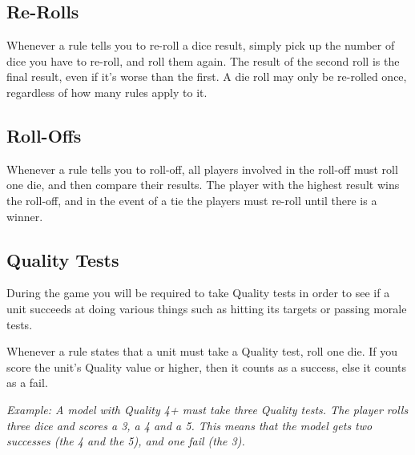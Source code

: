 \documentclass[9pt, a4paper, bookmarks=false]{extarticle}            %
\begin{document}
\begin{multicols}{2}
\subsection{Re-Rolls}

Whenever a rule tells you to re-roll a dice result, simply pick up the number of dice you have to re-roll, and roll them again. The result of the second roll is the final result, even if it’s worse than the first. A die roll may only be re-rolled once, regardless of how many rules apply to it.

\subsection{Roll-Offs}

Whenever a rule tells you to roll-off, all players involved in the roll-off must roll one die, and then compare their results. The player with the highest result wins the roll-off, and in the event of a tie the players must re-roll until there is a winner.

\subsection{Quality Tests}

During the game you will be required to take Quality tests in order to see if a unit succeeds at doing various things such as hitting its targets or passing morale tests.

Whenever a rule states that a unit must take a Quality test, roll one die. If you score the unit’s Quality value or higher, then it counts as a success, else it counts as a fail.

\textit{Example: A model with Quality 4+ must take three Quality tests. The player rolls three dice and scores a 3, a 4 and a 5. This means that the model gets two successes (the 4 and the 5), and one fail (the 3).}

\end{multicols}


\end{document}
